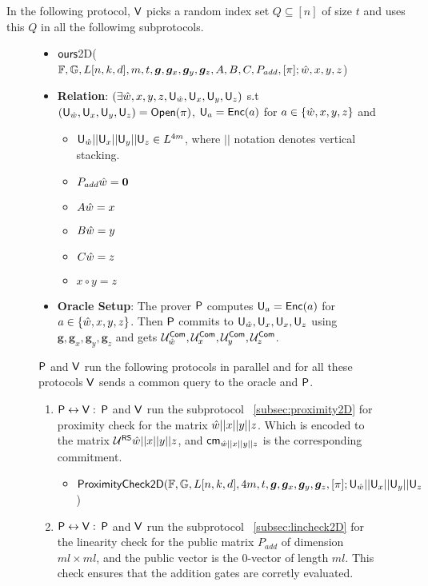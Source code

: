 In the following protocol, $\mathsf{V}$ picks a random index set $Q\subseteq [n]$ of size $t$ and uses this $Q$ in all the followimg subprotocols.
\begin{figure}[h!]
\centering
\begin{framed}
\begin{itemize}
	\item {$\textsf{ours}$2D($\mathbb{F}, \mathbb{G}, L[n,k,d], m, t, \bm{g}, \bm{g}_x, \bm{g}_y, \bm{g}_z, A,B,C, P_{add}, [\pi]; \hat{w}, x, y, z$)}
	\item {\bf Relation}: $(\exists \hat{w}, x, y, z, \mathsf{U}_{\hat{w}}, \mathsf{U}_x, \mathsf{U}_y, \mathsf{U}_z)$ s.t $(\mathsf{U}_{\hat{w}} , \mathsf{U}_x, \mathsf{U}_y, \mathsf{U}_z) = \mathsf{Open}(\pi)$, $\mathsf{U}_a = \mathsf{Enc}(a)$ for $a\in \{\hat{w}, x,y,z\}$ and 
	\begin{itemize}
		\item $\mathsf{U}_{\hat{w}}||\mathsf{U}_x||\mathsf{U}_y||\mathsf{U}_z \in L^{4m}$, where $||$ notation denotes vertical stacking.
		\item $P_{add} \hat{w} = \bm{0}$
		\item $A\hat{w} = x$
		\item $B\hat{w} = y$
		\item $C\hat{w} = z$
		\item $x\circ y = z$
	\end{itemize}
	\item {\bf Oracle Setup}: The prover $\mathsf{P}$ computes $\mathsf{U}_a =\mathsf{Enc}(a)$ for $a\in \{\hat{w},x,y,z\}$. Then $\mathsf{P}$ commits to $\mathsf{U}_{\hat{w}}, \mathsf{U}_x, \mathsf{U}_x, \mathsf{U}_z$ using $\bm{g}, \bm{g}_x, \bm{g}_y, \bm{g}_z$ and gets $\mathcal{U}^{\mathsf{Com}}_{\hat{w}}, \mathcal{U}^{\mathsf{Com}}_{x}, \mathcal{U}^{\mathsf{Com}}_{y}, \mathcal{U}^{\mathsf{Com}}_{z}$.
\end{itemize}
$\mathsf{P}$ and $\mathsf{V}$ run the following protocols in parallel and for all these protocols $\mathsf{V}$ sends a common query to the oracle and $\mathsf{P}$.
\begin{enumerate}
	\item $\mathsf{P} \leftrightarrow \mathsf{V}: $ $\mathsf{P}$ and $\mathsf{V}$ run the subprotocol ~\ref{subsec:proximity2D} for proximity check for the matrix $\hat{w}||x||y||z$. Which is encoded to the matrix $\mathcal{U}^{\mathsf{RS}}{\hat{w}||x||y||z}$, and $\mathsf{cm}_{\hat{w}||x||y||z}$ is the corresponding commitment.
	\begin{itemize}
		\item $\mathsf{ProximityCheck2D}(\mathbb{F}, \mathbb{G}, L[n,k,d], 4m, t, \bm{g}, \bm{g}_x, \bm{g}_y, \bm{g}_z, [\pi]; \mathsf{U}_{\hat{w}}||\mathsf{U}_x||\mathsf{U}_y||\mathsf{U}_z$)
	\end{itemize}
	\item $\mathsf{P} \leftrightarrow \mathsf{V}: $ $\mathsf{P}$ and $\mathsf{V}$ run the subprotocol ~\ref{subsec:lincheck2D} for the linearity check for the public matrix $P_{add}$ of dimension $ml\times ml$, and the public vector is the 0-vector of length $ml$. This check ensures that the addition gates are corretly evaluated.

\end{enumerate}
\end{framed}
\end{figure}

